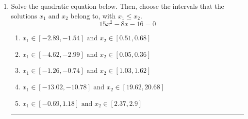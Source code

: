 \documentclass[14pt]{extbook}
\newcommand{\litem}[1]{\item#1\hspace*{-1cm}\rule{\textwidth}{0.4pt}}
\begin{document}
\begin{enumerate}
{\begin{enumerate}[label=\Alph*.]
\end{enumerate} }
\litem{
Solve the quadratic equation below. Then, choose the intervals that the solutions $x_1$ and $x_2$ belong to, with $x_1 \leq x_2$.\[ 15x^{2} -8 x -16 = 0 \]\begin{enumerate}[label=\Alph*.]
\item \( x_1 \in [-2.89, -1.54] \text{ and } x_2 \in [0.51, 0.68] \)
\item \( x_1 \in [-4.62, -2.99] \text{ and } x_2 \in [0.05, 0.36] \)
\item \( x_1 \in [-1.26, -0.74] \text{ and } x_2 \in [1.03, 1.62] \)
\item \( x_1 \in [-13.02, -10.78] \text{ and } x_2 \in [19.62, 20.68] \)
\item \( x_1 \in [-0.69, 1.18] \text{ and } x_2 \in [2.37, 2.9] \)

\end{enumerate} }
\end{enumerate}
\end{document}
